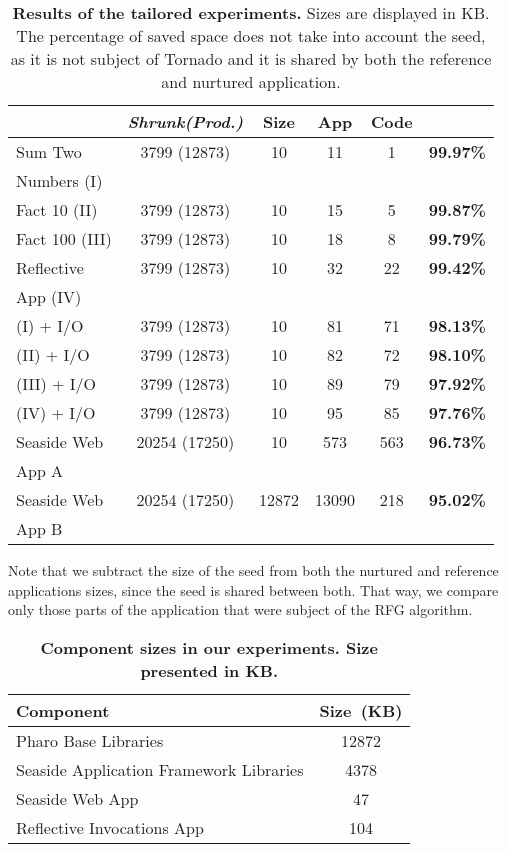 \begin{description}
\begin{table}[ht]
\begin{tabular}{lccccc}
 			& \textbf{\emph{Shrunk(Prod.)}}
			& \textbf{Size}
			& \textbf{App}
			& \textbf{Code}
			& \textbf{}\\
		\toprule
		Sum Two
 			&  3799 (12873) & 10 & 11 & 1 & \textbf{99.97\%}\\
		Numbers (I)
 			& &&&&\\
		\midrule
		Fact 10 (II)
 			& 3799 (12873) & 10 & 15 & 5 & \textbf{99.87\%}\\
		\midrule
		Fact 100 (III)
 			& 3799 (12873) & 10 & 18 & 8 & \textbf{99.79\%}\\
		\midrule
		Reflective
 			& 3799 (12873) & 10 & 32 & 22 & \textbf{99.42\%}\\
		App (IV)&&&&&\\
		\midrule
		(I) + I/O
 			& 3799 (12873) & 10 & 81 & 71 & \textbf{98.13\%}\\
		\midrule
		(II) + I/O
 			& 3799 (12873) & 10 & 82 & 72 & \textbf{98.10\%}\\
		\midrule
		(III) + I/O
 			& 3799 (12873) & 10 & 89 & 79 & \textbf{97.92\%}\\
		\midrule
		(IV) + I/O
 			& 3799 (12873) & 10 & 95 & 85 & \textbf{97.76\%}\\
		\midrule
		Seaside Web
 			& 20254 (17250) & 10 & 573 & 563 & \textbf{96.73\%}\\
		App A&&&&&\\
		\midrule
		Seaside Web
 			& 20254 (17250) & 12872 & 13090 & 218 & \textbf{95.02\%}\\
		App B&&&&&\\
		\bottomrule
 	\end{tabular}
 	\caption{\small\textbf{Results of the tailored experiments.} Sizes are displayed in KB. The percentage of saved space does not take into account the seed, as it is not subject of Tornado and it is shared by both the reference and nurtured application.}
 	\label{tb:results}
 \end{table}


Note that we subtract the size of the seed from both the nurtured and reference applications sizes, since the seed is shared between both. That way, we compare only those parts of the application that were subject of the RFG algorithm.

\end{description}

 \begin{table}[ht]
 	\centering
 	\begin{tabular}{lc}
			\toprule
			\textbf{Component}
 			& \textbf{Size~(KB)}\\
		\toprule
		Pharo Base Libraries & 12872\\\midrule
		Seaside Application Framework Libraries & 4378\\\midrule
		Seaside Web App & 47\\\midrule
		Reflective Invocations App & 104\\\bottomrule
 	\end{tabular}
 	\caption{\small\textbf{Component sizes in our experiments. Size presented in KB.} \label{tb:tailored_components}}
 	\label{tb:basic_sizes}
 \end{table}

